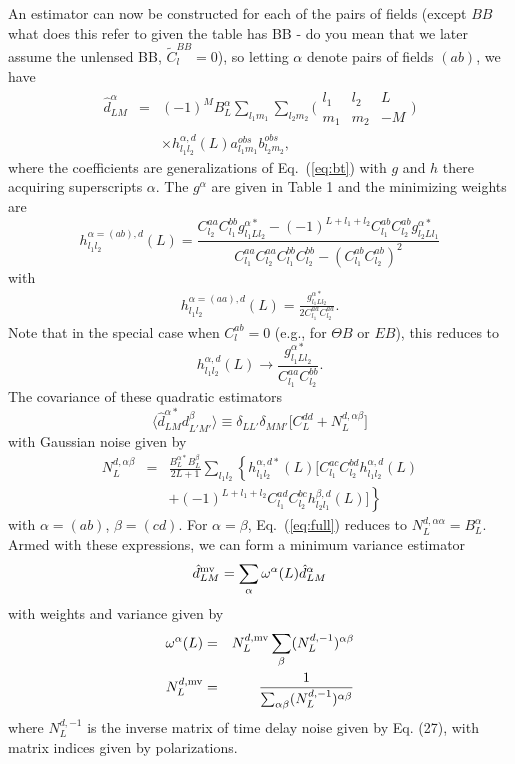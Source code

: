 \documentclass[prl,amsmath,amssymb,floatfix,superscriptaddress,nofootinbib,twocolumn]{revtex4-1}
\def\be{\begin{equation}}
\def\ee{\end{equation}}
\def\bea{\begin{eqnarray}}
\def\eea{\end{eqnarray}}
\newcommand{\ec}[1]{Eq.~(\ref{eq:#1})}
\newcommand{\eql}[1]{\label{eq:#1}}
\newcommand{\wh}[1]{{\color{red} #1}}
\begin{document}
An estimator can now be constructed for each of the pairs of fields (except $BB$ \wh{what does this refer to given the table has BB - do you mean that we later assume the unlensed BB, $\tilde C_l^{BB}=0$}), so letting $\alpha$ denote pairs of fields $(ab)$, we have
\bea
\hat{d}^{\alpha}_{LM} &=&\nonumber  (-1)^{M} B_{L}^{\alpha}\sum_{l_{1}m_{1}}\sum_{l_{2}m_{2}}\bigl(\begin{smallmatrix} l_1 & l_2 & L \\ m_1 & m_2 & -M  \end{smallmatrix}\bigr) \\
&& \times h^{\alpha,d}_{l_{1}l_{2}}(L) a^{obs}_{l_{1}m_{1}}b^{obs}_{l_{2}m_{2}} ,
\eea
where the coefficients are generalizations of \ec{bt} with $g$ and $h$ there acquiring superscripts $\alpha$. The $g^\alpha$ are given in Table 1 and the minimizing weights are
\be
h^{\alpha=(ab),d}_{l_{1}l_{2}}(L) 
= \frac{C_{l_{2}}^{aa}C_{l_{1}}^{bb}g^{\alpha*}_{l_{1}Ll_{2}}-(-1)^{L+l_{1}+l_{2}}C_{l_{1}}^{ab}C_{l_{2}}^{ab}g^{\alpha*}_{l_{2}Ll_{1}}}{C_{l_{1}}^{aa}C_{l_{2}}^{aa}C_{l_{1}}^{bb}C_{l_{2}}^{bb}-(C_{l_{1}}^{ab}C_{l_{2}}^{ab})^{2}}
\ee
with 
\bea 
h_{l_{1}l_{2}}^{\alpha=(aa),d}(L)= \frac{g_{l_{1}Ll_{2}}^{\alpha*}}{2C_{l_{1}}^{aa}C_{l_{2}}^{aa}}.
\eea 
Note that in the special case when $C_{l}^{ab}=0$ (e.g., for $\Theta B$ or $EB$), this reduces to 
\be
h^{\alpha,d}_{l_{1}l_{2}}(L) \rightarrow \frac{g^{\alpha *}_{l_{1}Ll_{2}}}{C_{l_{1}}^{aa}C_{l_{2}}^{bb}}. 
\ee
The covariance of these quadratic estimators
\be
\langle \hat{d}^{\alpha*}_{LM}d^{\beta}_{L'M'}\rangle \equiv \delta_{LL'}\delta_{MM'}\big[ C_{L}^{dd}+N_{L}^{d,\alpha \beta} \big]
\ee
with Gaussian noise given by
\bea
N_{L}^{d,\alpha\beta}&=&\frac{B_{L}^{\alpha*}B_{L}^{\beta}}{2L+1}\sum_{l_{1}l_{2}}  \left\{ h_{l_{1}l_{2}}^{\alpha,d*} (L)\big[ C_{l_{1}}^{ac}C_{l_{2}}^{bd}h_{l_{1}l_{2}}^{\alpha,d}(L)\right. \nonumber \\
&&\left. +(-1)^{L+l_{1}+l_{2}}C_{l_{1}}^{ad}C_{l_{2}}^{bc} h_{l_{2}l_{1}}^{\beta,d}(L)  \big]\right\}\eql{full}
\eea
with $\alpha=(ab)$, $\beta=(cd)$. For $\alpha=\beta$, \ec{full} reduces to $N_{L}^{d,\alpha\alpha}=B_{L}^{\alpha}$.
Armed with these expressions, we can form a minimum variance estimator
\be
\hat{d}^{\rm mv}_{LM} = \sum_{\alpha}\omega^{\alpha}(L)\hat{d}^{\alpha}_{LM}
\ee
with weights and variance given by
\bea
\omega^{\alpha}(L) & =&N^{d,\rm mv}_{L} \sum_{\beta}(N_{L}^{d,-1})^{\alpha \beta} \\
N^{d,\rm mv}_{L} &=& \frac{1}{\sum_{\alpha\beta} (N_{L}^{d,-1})^{\alpha \beta}}
\eea
where $N_{L}^{d,-1}$ is the inverse matrix of time delay noise given by Eq. (27), with matrix indices given by polarizations. 
\end{document}
